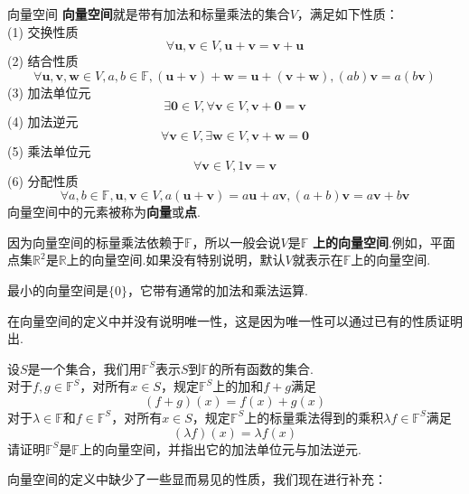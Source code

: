 \documentclass[lang=cn, zihao=5]{elegantbook}
\newcommand{\R}{\mathbb{R}}
\newcommand{\F}{\mathbb{F}}
\begin{document}
\begin{definition}{向量空间}
	\textbf{向量空间}就是带有加法和标量乘法的集合$V$，满足如下性质： \\
	(1) 交换性质$$\forall \boldsymbol{u},\boldsymbol{v} \in V , \boldsymbol{u} + \boldsymbol{v} = \boldsymbol{v} + \boldsymbol{u}$$
	(2) 结合性质$$\forall \boldsymbol{u},\boldsymbol{v},\boldsymbol{w} \in V, a,b \in \F, (\boldsymbol{u} + \boldsymbol{v}) + \boldsymbol{w} = \boldsymbol{u} + (\boldsymbol{v} + \boldsymbol{w}) , (ab) \boldsymbol{v} = a (b\boldsymbol{v})$$
	(3) 加法单位元$$\exists \boldsymbol{0} \in V, \forall \boldsymbol{v} \in V , \boldsymbol{v} + \boldsymbol{0} = \boldsymbol{v}$$
	(4) 加法逆元$$\forall \boldsymbol{v} \in V , \exists \boldsymbol{w} \in V , \boldsymbol{v} + \boldsymbol{w} = \boldsymbol{0}$$
	(5) 乘法单位元$$\forall \boldsymbol{v} \in V , 1\boldsymbol{v} = \boldsymbol{v}$$
	(6) 分配性质$$\forall a,b \in \F , \boldsymbol{u},\boldsymbol{v} \in V , a (\boldsymbol{u} + \boldsymbol{v}) = a\boldsymbol{u} + a\boldsymbol{v} , (a+b)\boldsymbol{v} = a\boldsymbol{v}+b\boldsymbol{v}$$
	向量空间中的元素被称为\textbf{向量}或\textbf{点}.
\end{definition}
\begin{remark}
	因为向量空间的标量乘法依赖于$\F$，所以一般会说$V$是$\F$ \textbf{上的向量空间}.例如，平面点集$\R ^{2}$是$\R$上的向量空间.如果没有特别说明，默认$V$就表示在$\F$上的向量空间.
\end{remark}
\begin{remark}
	最小的向量空间是$\{ 0 \}$，它带有通常的加法和乘法运算.
\end{remark}
\begin{note}
	在向量空间的定义中并没有说明唯一性，这是因为唯一性可以通过已有的性质证明出.
\end{note}

\begin{example}
	设$S$是一个集合，我们用$\F ^{S}$表示$S$到$\F$的所有函数的集合. \\
	对于$f,g \in \F ^{S}$，对所有$x \in S$，规定$\F ^{S}$上的加和$f+g$满足$$(f+g)(x) = f(x) + g(x)$$
	对于$\lambda \in \F$和$f \in \F ^{S}$，对所有$x \in S$，规定$\F ^{S}$上的标量乘法得到的乘积$\lambda f \in \F ^{S}$满足$$(\lambda f)(x) = \lambda f(x)$$
	请证明$\F ^{S}$是$\F$上的向量空间，并指出它的加法单位元与加法逆元.
\end{example}

向量空间的定义中缺少了一些显而易见的性质，我们现在进行补充：
\end{document}
